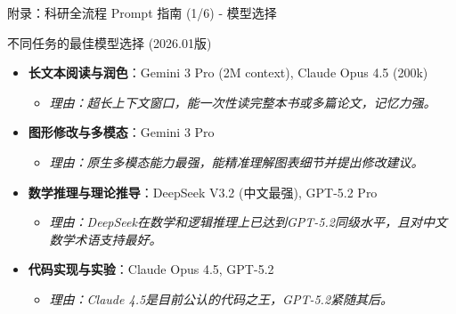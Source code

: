 \documentclass[aspectratio=169,11pt]{beamer}
\begin{document}
\begin{frame}{附录：科研全流程 Prompt 指南 (1/6) - 模型选择}
    \begin{block}{不同任务的最佳模型选择 (2026.01版)}
        \begin{itemize}
            \item \textbf{长文本阅读与润色}：\textcolor{googleblue}{Gemini 3 Pro} (2M context), \textcolor{anthropicred}{Claude Opus 4.5} (200k)
                \begin{itemize}
                    \item \textit{理由：超长上下文窗口，能一次性读完整本书或多篇论文，记忆力强。}
                \end{itemize}
            \item \textbf{图形修改与多模态}：\textcolor{googleblue}{Gemini 3 Pro}
                \begin{itemize}
                    \item \textit{理由：原生多模态能力最强，能精准理解图表细节并提出修改建议。}
                \end{itemize}
            \item \textbf{数学推理与理论推导}：\textcolor{deepseekblue}{DeepSeek V3.2 (中文最强)}, \textcolor{openaigreen}{GPT-5.2 Pro}
                \begin{itemize}
                    \item \textit{理由：DeepSeek在数学和逻辑推理上已达到GPT-5.2同级水平，且对中文数学术语支持最好。}
                \end{itemize}
            \item \textbf{代码实现与实验}：\textcolor{anthropicred}{Claude Opus 4.5}, \textcolor{openaigreen}{GPT-5.2}
                \begin{itemize}
                    \item \textit{理由：Claude 4.5是目前公认的代码之王，GPT-5.2紧随其后。}
                \end{itemize}
        \end{itemize}
    \end{block}
\end{frame}
\end{document}
